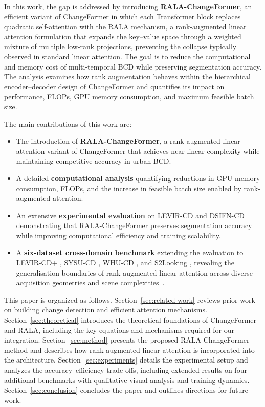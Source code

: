 \documentclass[runningheads]{llncs}
\newcommand{\journal}[1]{{\color{orange}#1}}
\begin{document}
In this work, the gap is addressed by introducing \textbf{RALA-ChangeFormer},
an efficient variant of ChangeFormer in which each Transformer block replaces
quadratic self-attention with the RALA mechanism, a rank-augmented linear
attention formulation that expands the key–value space through a weighted
mixture of multiple low-rank projections, preventing the collapse typically
observed in standard linear attention. The goal is to reduce the computational
and memory cost of multi-temporal BCD while preserving segmentation accuracy.
The analysis examines how rank augmentation behaves within the hierarchical
encoder–decoder design of ChangeFormer and quantifies its impact on
performance, FLOPs, GPU memory consumption, and maximum feasible batch size.

The main contributions of this work are:
\begin{itemize}
    \item The introduction of \textbf{RALA-ChangeFormer}, a rank-augmented
          linear attention variant of ChangeFormer that achieves near-linear
          complexity while maintaining competitive accuracy in urban BCD.
    \item A detailed \textbf{computational analysis} quantifying reductions
          in GPU memory consumption, FLOPs, and the increase in feasible batch
          size enabled by rank-augmented attention.
    \item An extensive \textbf{experimental evaluation} on LEVIR-CD and
          DSIFN-CD demonstrating that RALA-ChangeFormer preserves segmentation
          accuracy while improving computational efficiency and training
          scalability.
    \item \journal{A \textbf{six-dataset cross-domain benchmark} extending the evaluation to LEVIR-CD+ \cite{Zheng2020LEVIR}, SYSU-CD \cite{ShiSYSU2022}, WHU-CD \cite{Ji2019WHU}, and S2Looking \cite{ShenS2Looking2021}, revealing the generalisation boundaries of rank-augmented linear attention across diverse acquisition geometries and scene complexities~\cite{acuna2026efficient}.}
\end{itemize}

This paper is organized as follows.
Section~\ref{sec:related-work} reviews prior work on building change detection
and efficient attention mechanisms.
Section~\ref{sec:theoretical} introduces the theoretical foundations of
ChangeFormer and RALA, including the key equations and mechanisms required for
our integration.
Section~\ref{sec:method} presents the proposed RALA-ChangeFormer method and
describes how rank-augmented linear attention is incorporated into the
architecture.
Section~\ref{sec:experiments} details the experimental setup and analyzes the
accuracy–efficiency trade-offs\journal{, including extended results on four
additional benchmarks with qualitative visual analysis and training dynamics}.
Section~\ref{sec:conclusion} concludes the paper and outlines directions for
future work.
\end{document}
